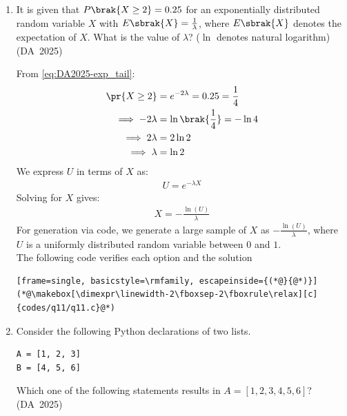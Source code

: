 \begin{enumerate}[label=\thesubsection.\arabic*, ref=\thesubsection.\theenumi]
	\item 
	It is given that $P\brak{X \ge 2} = 0.25$ for an exponentially distributed random variable $X$ with $E\sbrak{X} = \frac{1}{\lambda}$, where $E\sbrak{X}$ denotes the expectation of $X$. What is the value of $\lambda$? ($\ln$ denotes natural logarithm)
	\hfill (DA~2025)
	\begin{enumerate}
	\end{enumerate}
	\solution
	From \eqref{eq:DA2025-exp_tail}:
	\begin{align}
		\pr{X \ge 2} &= e^{-2\lambda} = 0.25 = \frac{1}{4}
		\\
		\implies -2\lambda &= \ln\brak{\frac{1}{4}} = -\ln 4
		\\
		\implies 2\lambda &= 2\ln 2
		\\
		\implies \lambda &= \ln 2
	\end{align}
We express $U$ in terms of $X$ as:
\begin{align}
	U = e^{-\lambda X}
\end{align}
Solving for $X$ gives:
\begin{align}
	X = -\frac{\ln(U)}{\lambda}
\end{align}For generation via code, we generate a large sample of $X$ as $-\frac{\ln(U)}{\lambda}$, where $U$ is a uniformly distributed random variable between $0$ and $1$.
	\\
		The following code verifies each option and the solution
	\begin{lstlisting}[frame=single, basicstyle=\rmfamily, escapeinside={(*@}{@*)}]
(*@\makebox[\dimexpr\linewidth-2\fboxsep-2\fboxrule\relax][c]{codes/q11/q11.c}@*)
	\end{lstlisting}
\item 
Consider the following Python declarations of two lists.
\begin{lstlisting}[frame=single, basicstyle=\rmfamily]
A = [1, 2, 3]
B = [4, 5, 6]
\end{lstlisting}
Which one of the following statements results in $A = [1, 2, 3, 4, 5, 6]$?
\hfill (DA~2025)
\begin{enumerate}
\end{enumerate}
\end{enumerate}
